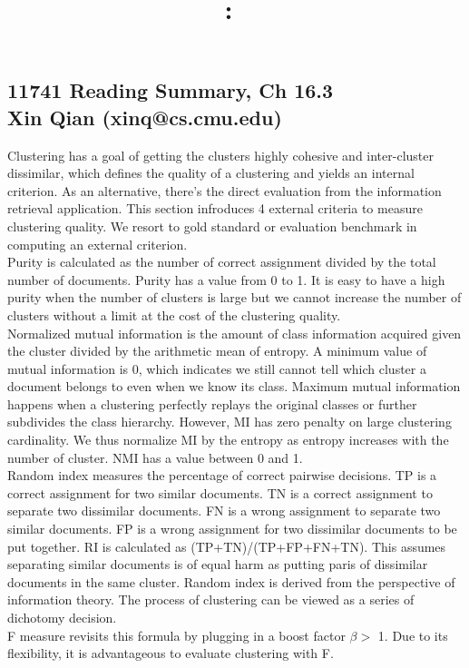 \documentclass[12pt]{article}
\title{
\textmd{\textbf{\hmwkClass:\ \hmwkTitle}
}}
\author{\textbf{\hmwkAuthorName}}
\begin{document}
\subsection{11741 Reading Summary, Ch 16.3 \\Xin Qian (xinq@cs.cmu.edu)}
Clustering has a goal of getting the clusters highly cohesive and inter-cluster dissimilar, which defines the quality of a clustering and yields an internal criterion. As an alternative, there's the direct evaluation from the information retrieval application. This section infroduces 4 external criteria to measure clustering quality. We resort to gold standard or evaluation benchmark in computing an external criterion. \\

Purity is calculated as the number of correct assignment divided by the total number of documents. Purity has a value from 0 to 1. It is easy to have a high purity when the number of clusters is large but we cannot increase the number of clusters without a limit at the cost of the clustering quality. \\

Normalized mutual information is the amount of class information acquired given the cluster divided by the arithmetic mean of entropy. A minimum value of mutual information is 0, which indicates we still cannot tell which cluster a document belongs to even when we know its class. Maximum mutual information happens when a clustering perfectly replays the original classes or further subdivides the class hierarchy. However, MI has zero penalty on large clustering cardinality. We thus normalize MI by the entropy as entropy increases with the number of cluster. NMI has a value between 0 and 1. \\

Random index measures the percentage of correct pairwise decisions. TP is a correct assignment for two similar documents. TN is a correct assignment to separate two dissimilar documents. FN is a wrong assignment to separate two similar documents. FP is a wrong assignment for two dissimilar documents to be put together. RI is calculated as (TP+TN)/(TP+FP+FN+TN). This assumes separating similar documents is of equal harm as putting paris of dissimilar documents in the same cluster. Random index is derived from the perspective of information theory. The process of clustering can be viewed as a series of dichotomy decision. \\

F measure revisits this formula by plugging in a boost factor $\beta >$ 1. Due to its flexibility, it is advantageous to evaluate clustering with F. 








\end{document}
